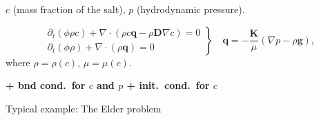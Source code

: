 \begin {frame} [t]
\centerline {{\color [rgb] {0, 0, 1} $c$} (mass fraction of the salt),
{\color [rgb] {0, 0, 1} $p$} (hydrodynamic pressure).}
\vspace {-3ex}
$$
 \left .
 \begin {array} {c}
  \partial_t (\phi \rho c)
   + \nabla \cdot ( \rho c \mathbf{q} - \rho \mathbf{D} \nabla c ) = 0 \\[2ex]
  \partial_t (\phi \rho) + \nabla \cdot (\rho \mathbf{q}) = 0
 \end {array}
 \right \} \quad \mathbf{q} = - \dfrac {\mathbf{K}} {\mu} (\nabla p - \rho \mathbf{g}),
$$
where $\rho = \rho (c)$, $\mu = \mu (c)$.

\vspace {1ex}
\centerline {\textbf {+ bnd cond.\ for $c$ and $p$ + init.\ cond.\ for $c$}}

%
{%
\vspace {1ex}
\centerline {Typical example: The Elder problem}
}%
\end {frame}

